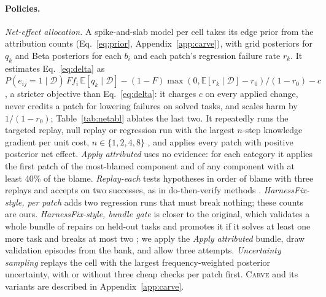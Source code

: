 \documentclass[11pt]{article}
\newcommand{\carve}{\textsc{Carve}}
\begin{document}
\paragraph{Policies.} \emph{Net-effect allocation.} A spike-and-slab model per cell takes its edge prior from the attribution counts (Eq.~\ref{eq:prior}, Appendix~\ref{app:carve}), with grid posteriors for $q_k$ and Beta posteriors for each $b_i$ and each patch's regression failure rate $r_k$. It estimates Eq.~\ref{eq:delta} as $P(e_{ij}{=}1\mid\mathcal D)\,Ff_i\,\mathbb E[q_k\mid\mathcal D]-(1-F)\max(0,\mathbb E[r_k\mid\mathcal D]-r_0)/(1-r_0)-c$, a stricter objective than Eq.~\ref{eq:delta}: it charges $c$ on every applied change, never credits a patch for lowering failures on solved tasks, and scales harm by $1/(1-r_0)$; Table~\ref{tab:netabl} ablates the last two. It repeatedly runs the targeted replay, null replay or regression run with the largest $n$-step knowledge gradient per unit cost, $n\in\{1,2,4,8\}$ \citep{frazier2008kg}, and applies every patch with positive posterior net effect. \emph{Apply attributed} uses no evidence: for each category it applies the first patch of the most-blamed component and of any component with at least 40\% of the blame. \emph{Replay-each} tests hypotheses in order of blame with three replays and accepts on two successes, as in do-then-verify methods \citep{ma2025dover}. \emph{HarnessFix-style, per patch} adds two regression runs that must break nothing; these counts are ours. \emph{HarnessFix-style, bundle gate} is closer to the original, which validates a whole bundle of repairs on held-out tasks and promotes it if it solves at least one more task and breaks at most two \citep{chen2026harnessfix}; we apply the \emph{Apply attributed} bundle, draw validation episodes from the bank, and allow three attempts. \emph{Uncertainty sampling} replays the cell with the largest frequency-weighted posterior uncertainty, with or without three cheap checks per patch first. \carve{} and its variants are described in Appendix~\ref{app:carve}.
\end{document}
